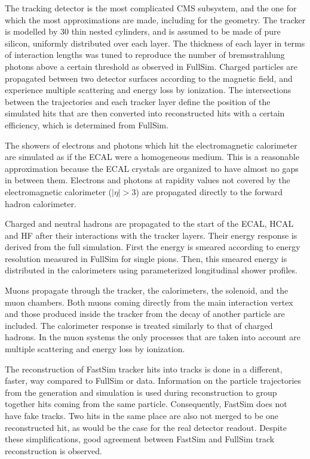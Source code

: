 The tracking detector is the most complicated CMS subsystem, and the one for which the most
approximations are made, including for the geometry.
The tracker is modelled by 30 thin nested cylinders, and is assumed to be made of pure silicon,
uniformly distributed over each layer. The thickness of each layer in terms of interaction lengths
was tuned to reproduce the number of bremsstrahlung photons above a certain threshold as observed in
FullSim.
Charged particles are propagated between two detector surfaces according to the magnetic field, and
experience multiple scattering and energy loss by ionization. The intersections between the
trajectories and each tracker layer define the position of the simulated hits that are then
converted into reconstructed hits with a certain efficiency, which is determined from FullSim. 

The showers of electrons and photons which hit the electromagnetic calori\-meter are simulated as if
the ECAL were a homogeneous medium. This is a reasonable approximation because the ECAL crystals
are organized to have almost no gaps in between them. 
Electrons and photons at rapidity values not covered by the electromagnetic calorimeter ($|\eta| >
3$) are propagated directly to the forward hadron calorimeter.

Charged and neutral hadrons are propagated to the start of the ECAL, HCAL and HF after their
interactions with the tracker layers. Their energy response is derived from the full
simulation. First the energy is smeared according to energy resolution measured in FullSim for
single pions. Then, this smeared energy is distributed in the calorimeters using parameterized
longitudinal shower profiles. 

Muons propagate through the tracker, the calorimeters, the solenoid, and the muon chambers. 
Both muons coming directly from the main interaction vertex and those produced inside the
tracker from the decay of another particle are included. 
The calorimeter response is treated similarly to that of charged hadrons. In the muon systems the
only processes that are taken into account are multiple scattering and energy loss by ionization.

The reconstruction of FastSim tracker hits into tracks is done in a different, faster, way compared
to FullSim or data. Information on the particle trajectories from the generation and simulation is
used during reconstruction to group together hits coming from the same particle.
Consequently, FastSim does not have fake tracks. Two hits in the same place are also not
merged to be one reconstructed hit, as would be the case for the real detector readout. 
Despite these simplifications, good agreement between FastSim and FullSim track reconstruction is
observed. 


